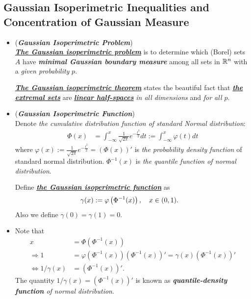 \documentclass[11pt]{article}
\begin{document}
\subsection{Gaussian Isoperimetric Inequalities and  Concentration of Gaussian Measure}
\begin{itemize}
\item \begin{remark} (\textbf{\emph{Gaussian Isoperimetric Problem}})\\
\underline{\emph{\textbf{The Gaussian isoperimetric problem}}} is to determine which (Borel) sets $A$ have \emph{\textbf{minimal Gaussian boundary measure}} among all sets in ${\mathbb R}^n$ with a \emph{given probability} $p$. 

\underline{\emph{\textbf{The Gaussian isoperimetric theorem}}} states the beautiful fact that \underline{\emph{\textbf{the extremal sets}}} are \underline{\emph{\textbf{linear half-spaces}}} \emph{in all dimensions} and \emph{for all $p$}.
\end{remark}

\item \begin{definition} (\textbf{\emph{Gaussian Isoperimetric Function}}) \\
Denote \emph{the cumulative distribution function of standard Normal distribution}:
\begin{align*}
\Phi(x) &= \int_{-\infty}^{x}\frac{1}{\sqrt{2\pi}}e^{-\frac{t^2}{2}}dt := \int_{-\infty}^{x}\varphi(t) dt
\end{align*} where $\varphi(x) := \frac{1}{\sqrt{2\pi}}e^{-\frac{t^2}{2}} = (\Phi(x))'$ is \emph{the probability density function} of standard normal distribution. $\Phi^{-1}(x)$ is \emph{the quantile function of normal distribution}.

Define \underline{\textbf{\emph{the Gaussian isoperimetric function}}} as 
\begin{align*}
\gamma(x) &:= \varphi\left(\Phi^{-1}(x)\right), \quad x \in (0,1). 
\end{align*} Also we define $\gamma(0) = \gamma(1) = 0$. 
\end{definition}

\item \begin{remark}
Note that
\begin{align*}
x &= \Phi(\Phi^{-1}(x)) \\
\Rightarrow 1 &= \varphi(\Phi^{-1}(x))(\Phi^{-1}(x))'  = \gamma(x) (\Phi^{-1}(x))' \\
\Leftrightarrow 1/\gamma(x) &= (\Phi^{-1}(x))'.
\end{align*} The quantity $1/\gamma(x) = (\Phi^{-1}(x))'$ is known as \emph{\textbf{quantile-density function} of normal distribution}.
\end{remark}


\end{itemize}
\end{document}
